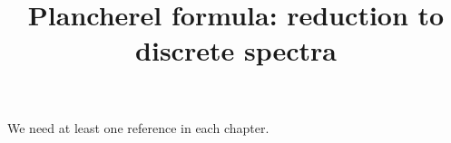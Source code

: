 

%


\title{Plancherel formula: reduction to discrete spectra}


\maketitle

\label{section-phantom}

\tableofcontents


We need at least one reference \cite{reference} in each chapter.














